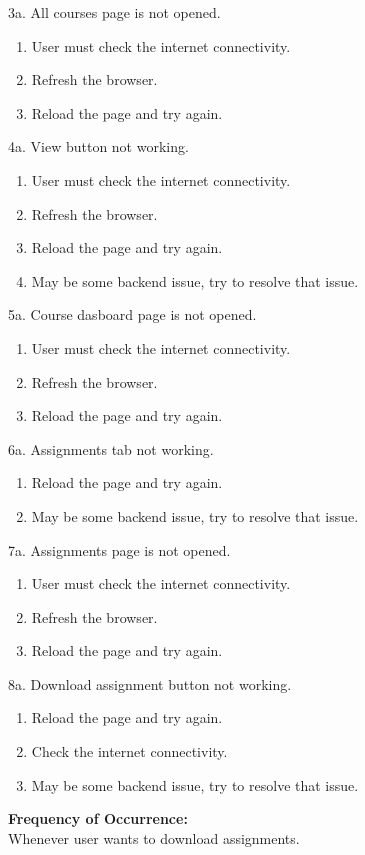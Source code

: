 3a. All courses page is not opened.
\begin{enumerate}
\item User must check the internet connectivity.
\item Refresh the browser.
\item Reload the page and try again.
\end{enumerate}
4a. View button not working.
\begin{enumerate}
\item User must check the internet connectivity.
\item Refresh the browser.
\item Reload the page and try again.
\item May be some backend issue, try to resolve that issue.
\end{enumerate}
5a. Course dasboard page is not opened.
\begin{enumerate}
\item User must check the internet connectivity.
\item Refresh the browser.
\item Reload the page and try again.
\end{enumerate}
6a. Assignments tab not working.
\begin{enumerate}
\item Reload the page and try again.
\item May be some backend issue, try to resolve that issue.
\end{enumerate}
7a. Assignments page is not opened.
\begin{enumerate}
\item User must check the internet connectivity.
\item Refresh the browser.
\item Reload the page and try again.
\end{enumerate}
8a. Download assignment button not working.
\begin{enumerate}
\item Reload the page and try again.
\item Check the internet connectivity.
\item May be some backend issue, try to resolve that issue.
\end{enumerate}
\textbf{Frequency of Occurrence:}\\
Whenever user wants to download assignments.



